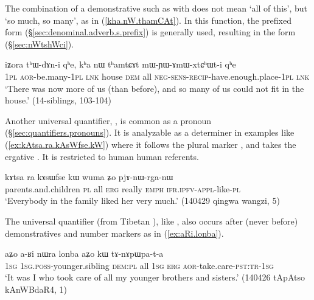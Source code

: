 The combination of a demonstrative such as  with   does not mean `all of this', but `so much, so many', as in (\ref{kha.nW.thamCAt}). In this function, the prefixed form  (§\ref{sec:denominal.adverb.s.prefix}) is generally used, resulting in the form  (§\ref{sec:nWtshWci}).

 
\begin{exe}
\ex \label{kha.nW.thamCAt}
 \gll iʑora tʰɯ-dɤn-i qʰe, kʰa nɯ tʰamtɕɤt mɯ-ɲɯ-ɤmɯ-xtɕʰɯt-i qʰe \\ 
 \textsc{1pl} \textsc{aor}-be.many-\textsc{1pl} \textsc{lnk} house \textsc{dem} all \textsc{neg}-\textsc{sens}-\textsc{recip}-have.enough.place-\textsc{1pl} \textsc{lnk} \\
 \glt `There was now more of us (than before), and so many of us could not fit in the house.' (14-siblings, 103-104)
 \end{exe}
 
 Another universal quantifier,  , is common as a pronoun (§\ref{sec:quantifiers.pronouns}). It is analyzable as a determiner in examples like  (\ref{ex:kAtsa.ra.kAsWfse.kW}) where it follows the plural marker , and takes the ergative .  It is restricted to human human referents.
 
 \begin{exe}
\ex \label{ex:kAtsa.ra.kAsWfse.kW}
\gll  kɤtsa ra kɤsɯfse kɯ wuma ʑo pjɤ-nɯ-rga-nɯ  \\
parents.and.children \textsc{pl} all \textsc{erg} really \textsc{emph} \textsc{ifr}.\textsc{ipfv}-\textsc{appl}-like-\textsc{pl} \\
\glt `Everybody in the family liked her very much.' (140429 qingwa wangzi, 5)
  \end{exe}

The universal quantifier  (from Tibetan ), like , also occurs after (never before) demonstratives and number markers as in (\ref{ex:aRi.lonba}).

 \begin{exe}
\ex \label{ex:aRi.lonba}
 \gll aʑo a-ʁi nɯra lonba aʑo kɯ tɤ-nɤpɯpa-t-a \\
 \textsc{1sg} \textsc{1sg}.\textsc{poss}-younger.sibling \textsc{dem}:\textsc{pl} all \textsc{1sg} \textsc{erg} \textsc{aor}-take.care-\textsc{pst}:\textsc{tr}-\textsc{1sg} \\
 \glt `It was I who took care of all my younger brothers and sisters.' (140426 tApAtso kAnWBdaR4, 1)
\end{exe}
 
